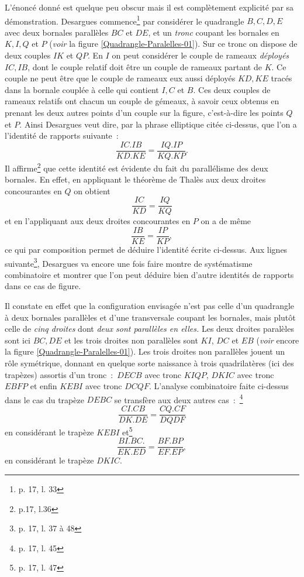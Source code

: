 \documentclass[12pt, a4paper]{article}
\begin{document}
L'énoncé donné  est quelque peu obscur mais il est complètement explicité par sa démonstration. Desargues commence\footnote{p. 17, l. 33} par considérer le quadrangle $B,C,D,E$ avec deux bornales parallèles $BC$ et $DE$, et un \emph{tronc} coupant les bornales en $K,I,Q$ et $P$ ({\it voir} la figure \ref{Quadrangle-Paralelles-01}). Sur ce tronc on dispose de deux couples $IK$ et $QP$. En $I$ on peut considérer le couple de rameaux \textit{déployés} $IC,IB$, dont le couple relatif doit être un couple de rameaux partant de $K$. Ce couple ne peut être que le couple de rameaux eux aussi déployés $KD,KE$ tracés dans la bornale couplée à celle qui contient $I,C$ et $B$. Ces deux couples de rameaux relatifs ont chacun un couple de gémeaux, à savoir ceux obtenus en prenant les deux autres points d'un couple sur la figure, c'est-à-dire les points $Q$ et $P$. Ainsi Desargues veut dire, par la phrase elliptique citée ci-dessus, que l'on a l'identité de rapports suivante~:~
\[
\frac{IC.IB}{KD.KE}=\frac{IQ.IP}{KQ.KP}.
\]
Il affirme\footnote{p.17, l.36}  que cette identité est évidente du fait du parallélisme des deux bornales. En effet, en appliquant le théorème de Thalès aux deux droites concourantes en $Q$ on obtient
\[
\frac{IC}{KD}=\frac{IQ}{KQ}
\]
et en l'appliquant aux deux droites concourantes en $P$ on a de même
\[
\frac{IB}{KE}=\frac{IP}{KP},
\]
ce qui par composition permet de déduire l'identité écrite ci-dessus. Aux lignes suivante\footnote{p. 17, l. 37 à 48}, Desargues va encore une fois faire montre de systématisme combinatoire et montrer que l'on peut déduire bien d'autre identités de rapports dans ce cas de figure.

Il constate en effet que la configuration envisagée n'est pas celle d'un quadrangle à deux bornales parallèles et d'une transversale coupant les bornales, mais plutôt celle de \textit{cinq droites} dont \textit{deux sont parallèles en elles.} Les deux droites paralèles sont ici $BC,DE$ et les trois droites non parallèles sont $KI$, $DC$ et $EB$ ({\it voir} encore la figure \ref{Quadrangle-Paralelles-01}). Les trois droites non parallèles jouent un rôle symétrique, donnant en quelque sorte naissance à trois quadrilatères (ici des trapèzes) assortis d'un tronc~:~$DECB$ avec tronc $KIQP$, $DKIC$ avec tronc $EBFP$ et enfin $KEBI$ avec tronc $DCQF$. L'analyse combinatoire faite ci-dessus dans le cas du trapèze $DEBC$ se transfère aux deux autres cas~:~\footnote{p. 17, l. 45}
\[
\frac{CI.CB}{DK.DE}=\frac{CQ.CF}{DQDF}
\]
en considérant le trapèze $KEBI$ et\footnote{p. 17, l. 47}
\[
\frac{BI.BC.}{EK.ED}=\frac{BF.BP}{EF.EP},
\]
en considérant le trapèze $DKIC$.
\end{document}
